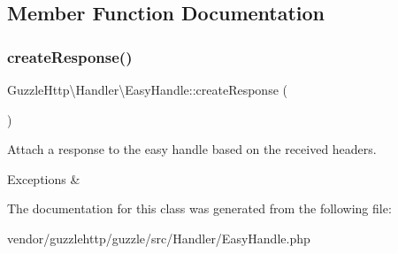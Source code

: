\subsection{Member Function Documentation}
\mbox{\label{classGuzzleHttp_1_1Handler_1_1EasyHandle_a394f20adee55837ccc05e479af9dfaea}} 
\subsubsection{\texorpdfstring{create\+Response()}{createResponse()}}
{\footnotesize\ttfamily Guzzle\+Http\textbackslash{}\+Handler\textbackslash{}\+Easy\+Handle\+::create\+Response (\begin{DoxyParamCaption}{ }\end{DoxyParamCaption})}

Attach a response to the easy handle based on the received headers.


\begin{DoxyExceptions}{Exceptions}
{\em } & \\
\hline
\end{DoxyExceptions}


The documentation for this class was generated from the following file\+:\begin{DoxyCompactItemize}
\item 
vendor/guzzlehttp/guzzle/src/\+Handler/Easy\+Handle.\+php\end{DoxyCompactItemize}
